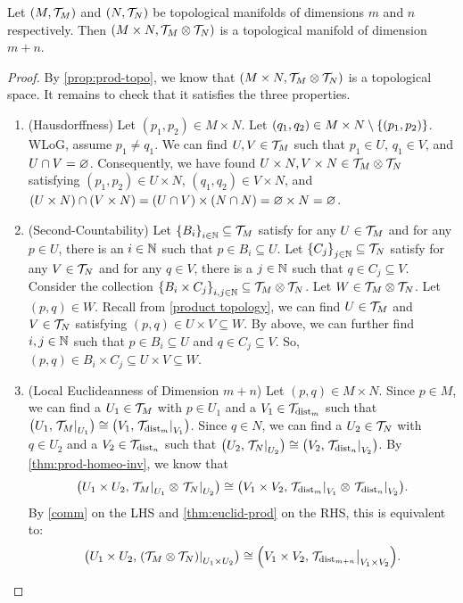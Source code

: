 \documentclass[11pt,reqno]{amsart}
\begin{document}
\begin{Prop}\label{prop:prod-manifold}
Let $(M,\mathcal{T}_M)$ and $(N,\mathcal{T}_N)$ be topological manifolds
of dimensions $m$ and $n$ respectively.
Then $(M\times N,\mathcal{T}_M\otimes\mathcal{T}_N)$ is a
topological manifold of dimension $m+n$.
\end{Prop}
\begin{proof}
By \ref{prop:prod-topo}, we know that $(M\times N,\mathcal{T}_M\otimes\mathcal{T}_N)$
is a topological space. It remains to check that it satisfies
the three properties.
\begin{enumerate}
\item (Hausdorffness)
Let $(p_1,p_2)\in M\times N$.
Let $(q_1,q_2)\in M\times N\setminus\set{(p_1,p_2)}$.
WLoG, assume $p_1\ne q_1$.
We can find $U,V\in\mathcal{T}_M$ such that $p_1\in U$, $q_1\in V$, and $U\cap V=\varnothing$.
Consequently, we have found $U\times N,V\times N\in\mathcal{T}_M\otimes\mathcal{T}_N$ satisfying
$(p_1,p_2)\in U\times N$, $(q_1,q_2)\in V\times N$, and
$(U\times N)\cap(V\times N)=(U\cap V)\times(N\cap N)=\varnothing\times N=\varnothing$.

\item (Second-Countability)
Let $\set{B_i}_{i\in\N}\subseteq\T_M$ satisfy
for any $U\in\mathcal{T}_M$ and for any $p\in U$, there is an $i\in\mathbb{N}$ such that
$p\in B_i\subseteq U$.
Let $\set{C_j}_{j\in\N}\subseteq\T_N$ satisfy
for any $V\in\mathcal{T}_N$ and for any $q\in V$, there is a $j\in\mathbb{N}$ such that
$q\in C_j\subseteq V$.
Consider the collection
$\set{B_i\times C_j}_{i,j\in\N}\subseteq\T_M\otimes\T_N$.
Let $W\in\mathcal{T}_M\otimes\mathcal{T}_N$. Let $(p,q)\in W$.
Recall from \ref{product topology},
we can find $U\in\mathcal{T}_M$ and $V\in\mathcal{T}_N$ satisfying $(p,q)\in U\times V\subseteq W$. By above, we can further find $i,j\in\mathbb{N}$ such that
$p\in B_i\subseteq U$ and $q\in C_j\subseteq V$.
So, $(p,q)\in B_i\times C_j\subseteq U\times V\subseteq W$.

\item (Local Euclideanness of Dimension $m+n$)
Let $(p,q)\in M\times N$.
Since $p\in M$, we can find a $U_1\in\mathcal{T}_M$ with $p\in U_1$ and
a $V_1\in\mathcal{T}_{\mathrm{dist}_m}$ such that
$\Br{U_1,\eval{\T_M}_{U_1}}\cong\Br{V_1,\eval{\T_{\dist_m}}_{V_1}}$.
Since $q\in N$, we can find a $U_2\in\mathcal{T}_N$ with $q\in U_2$ and
a $V_2\in\mathcal{T}_{\mathrm{dist}_n}$ such that
$\Br{U_2,\eval{\T_N}_{U_2}}\cong\Br{V_2,\eval{\T_{\dist_n}}_{V_2}}$.
By \ref{thm:prod-homeo-inv}, we know that
\[\Br{U_1\times U_2,\eval{\T_M}_{U_1}\otimes\eval{\T_N}_{U_2}}
\cong\Br{V_1\times V_2,\eval{\T_{\dist_m}}_{V_1}\otimes\eval{\T_{\dist_n}}_{V_2}}.
\]
By \ref{comm} on the LHS and \ref{thm:euclid-prod} on the RHS, this is equivalent to:
\[
\Br{U_1\times U_2,\eval{\Br{\T_M\otimes\T_N}}_{U_1\times U_2}}
\cong
\Br{V_1\times V_2,\eval{\T_{\dist_{m+n}}}_{V_1\times V_2}}.
\]
\end{enumerate}
\end{proof}
\end{document}
